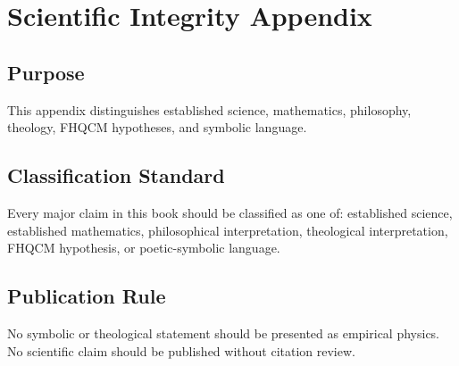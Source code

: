 \chapter{Scientific Integrity Appendix}

\section{Purpose}

This appendix distinguishes established science, mathematics, philosophy, theology, FHQCM hypotheses, and symbolic language.

\section{Classification Standard}

Every major claim in this book should be classified as one of: established science, established mathematics, philosophical interpretation, theological interpretation, FHQCM hypothesis, or poetic-symbolic language.

\section{Publication Rule}

No symbolic or theological statement should be presented as empirical physics. No scientific claim should be published without citation review.
